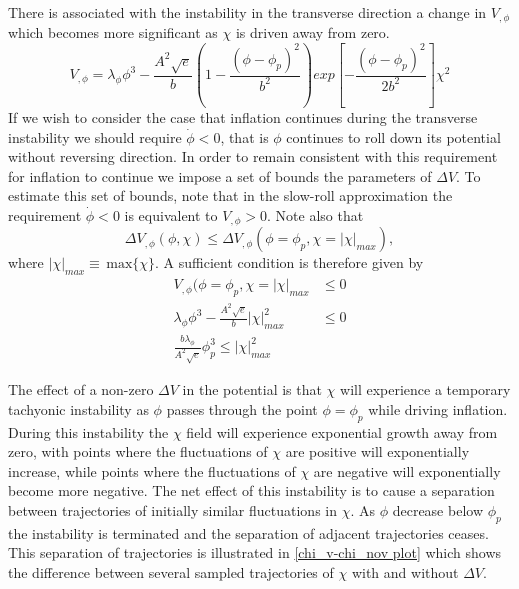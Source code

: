 \documentclass[letterpaper,11pt]{article}
\begin{document}
There is associated with the instability in the transverse direction a change in $V_{,\phi}$ which becomes more significant as $\chi$ is driven away from zero.
\begin{equation}
V_{,\phi} = \lambda_{\phi}\phi^3 - \frac{A^2\sqrt{e}}{b}(1 - \frac{(\phi-\phi_p)^2}{b^2})exp[-\frac{(\phi-\phi_p)^2}{2b^2}]\chi^2
\end{equation}
If we wish to consider the case that inflation continues during the transverse instability we should require $\dot{\phi}<0$, that is $\phi$ continues to roll down its potential without reversing direction. In order to remain consistent with this requirement for inflation to continue we impose a set of bounds the parameters of $\Delta V$. To estimate this set of bounds, note that in the slow-roll approximation the requirement $\dot{\phi}<0$ is equivalent to $V_{,\phi}>0$. Note also that
\begin{equation}
\Delta V_{,\phi}(\phi, \chi) \leq \Delta V_{,\phi}(\phi=\phi_p, \chi=|\chi|_{max}),
\end{equation}
where $|\chi|_{max} \equiv \,\mathrm{max}\{ \chi \}$. A sufficient condition is therefore given by
\begin{align}
V_{,\phi}(\phi=\phi_p, \chi=|\chi|_{max} & \leq 0 \\
\lambda_{\phi}\phi^3 - \frac{A^2\sqrt{e}}{b}|\chi|^2_{max} & \leq 0\\
\frac{b\lambda_{\phi}}{A^2\sqrt{e}}\phi_p^3 \leq |\chi|^2_{max}
\end{align}



The effect of a non-zero $\Delta V$ in the potential is that $\chi$ will experience a temporary tachyonic instability as $\phi$ passes through the point $\phi=\phi_p$ while driving inflation. During this instability the $\chi$ field will experience exponential growth away from zero, with points where the fluctuations of $\chi$ are positive will exponentially increase, while points where the fluctuations of $\chi$ are negative will exponentially become more negative. The net effect of this instability is to cause a separation between trajectories of initially similar fluctuations in $\chi$. As $\phi$ decrease below $\phi_p$ the instability is terminated and the separation of adjacent trajectories ceases. This separation of trajectories is illustrated in \ref{chi_v-chi_nov plot} which shows the difference between several sampled trajectories of $\chi$ with and without $\Delta V$.
\end{document}
